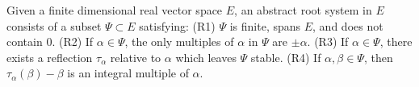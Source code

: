 Given a finite dimensional real vector space $E$, an abstract root system in $E$ consists of a subset $\Psi \subset E$ satisfying:
(R1) $\Psi$ is finite, spans $E$, and does not contain 0.
(R2) If $\alpha \in \Psi$, the only multiples of $\alpha$ in $\Psi$ are $\pm \alpha$.
(R3) If $\alpha \in \Psi$, there exists a reflection $\tau_\alpha$ relative to $\alpha$ which leaves $\Psi$ stable.
(R4) If $\alpha, \beta \in \Psi$, then $\tau_\alpha(\beta) - \beta$ is an integral multiple of $\alpha$.
